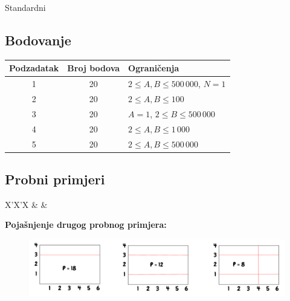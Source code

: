 \begin{statement}[
  problempoints=100,
  timelimit=1 sekunda,
  memorylimit=512 MiB,
]{Standardni}
\subsection*{Bodovanje}
{\renewcommand{\arraystretch}{1.4}
  \setlength{\tabcolsep}{6pt}
  \begin{tabular}{ccl}
 Podzadatak & Broj bodova & Ograničenja \\ \midrule
  1 & 20 & $2 \le A, B \le 500\,000$, $N = 1$\\
  2 & 20 & $2 \le A, B \le 100$ \\
  3 & 20 & $A = 1$, $2 \le B \le 500\,000$ \\
  4 & 20 & $2 \le A, B \le 1\,000$ \\
  5 & 20 & $2 \le A, B \le 500\,000$ \\
\end{tabular}}

\subsection*{Probni primjeri}
\begin{tabularx}{\textwidth}{X'X'X}
 &
 &
\end{tabularx}

\textbf{Pojašnjenje drugog probnog primjera:}
\begin{figure}[H]
\centering
\includegraphics[width=\textwidth]{img/standardni_skica.png}
\end{figure}

\end{statement}

